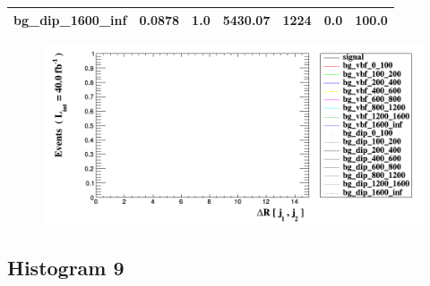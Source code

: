 \documentclass[a4paper, 10pt]{article}
\begin{document}
\begin{table}[H]
\begin{center}
\begin{tabular}{|m{23.0mm}|m{23.0mm}|m{18.0mm}|m{19.0mm}|m{19.0mm}|m{19.0mm}|m{19.0mm}|}
      \hline
      {\cellcolor{white}         bg\_dip\_1600\_inf}& {\cellcolor{white}         0.0878}& {\cellcolor{white}         1.0}& {\cellcolor{white}         5430.07}& {\cellcolor{white}         1224}& {\cellcolor{red}         0.0}& {\cellcolor{red}         100.0}\\
\hline
    \end{tabular}
  \end{center}
\end{table}

\begin{figure}[H]
  \begin{center}
    \includegraphics[scale=0.45]{selection_7.png}\\
\caption{   }
  \end{center}
\end{figure}
      \newpage
\subsection{ Histogram 9}
\end{document}
